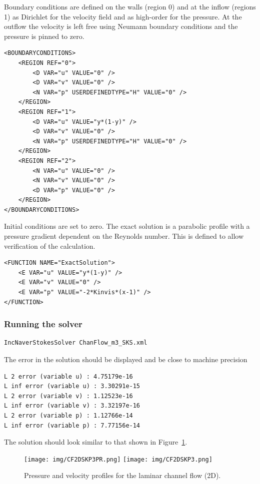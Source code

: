 Boundary conditions are defined on the walls (region 0) and at the inflow
(regions 1) as Dirichlet for the velocity field and as high-order for the
pressure. At the outflow the velocity is left free using Neumann boundary
conditions and the pressure is pinned to zero.
\begin{lstlisting}[style=XMLStyle]
<BOUNDARYCONDITIONS>
    <REGION REF="0">
        <D VAR="u" VALUE="0" />
        <D VAR="v" VALUE="0" />
        <N VAR="p" USERDEFINEDTYPE="H" VALUE="0" />
    </REGION>
    <REGION REF="1">
        <D VAR="u" VALUE="y*(1-y)" />
        <D VAR="v" VALUE="0" />
        <N VAR="p" USERDEFINEDTYPE="H" VALUE="0" />
    </REGION>
    <REGION REF="2">
        <N VAR="u" VALUE="0" />
        <N VAR="v" VALUE="0" />
        <D VAR="p" VALUE="0" />
    </REGION>
</BOUNDARYCONDITIONS>
\end{lstlisting}

Initial conditions are set to zero. The exact solution is a parabolic profile
with a pressure gradient dependent on the Reynolds number. This is defined to
allow verification of the calculation.
\begin{lstlisting}[style=XMLStyle]
<FUNCTION NAME="ExactSolution">
    <E VAR="u" VALUE="y*(1-y)" />
    <E VAR="v" VALUE="0" />
    <E VAR="p" VALUE="-2*Kinvis*(x-1)" />
</FUNCTION>
\end{lstlisting}

\subsubsection{Running the solver}
\begin{lstlisting}[style=BashInputStyle]
IncNaverStokesSolver ChanFlow_m3_SKS.xml
\end{lstlisting}

The error in the solution should be displayed and be close to machine precision
\begin{lstlisting}[style=BashInputStyle]
L 2 error (variable u) : 4.75179e-16
L inf error (variable u) : 3.30291e-15
L 2 error (variable v) : 1.12523e-16
L inf error (variable v) : 3.32197e-16
L 2 error (variable p) : 1.12766e-14
L inf error (variable p) : 7.77156e-14
\end{lstlisting}

The solution should look similar to that shown in
Figure~\ref{f:incns:laminar2d}.

\begin{figure}
\begin{center}
\texttt{[image: img/CF2DSKP3PR.png]}
\texttt{[image: img/CF2DSKP3.png]}
\caption{Pressure and velocity profiles for the laminar channel flow (2D).}
\label{f:incns:laminar2d}
\end{center}
\end{figure}



